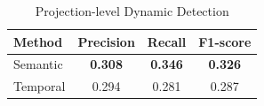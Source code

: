\begin{table}[t]
  \centering
  \caption{Projection-level Dynamic Detection}
  \label{tab:p4_projection_level}
  \begin{tabular}{lccc}
    \hline
    Method & Precision & Recall & F1-score \\
    \hline
    Semantic & \textbf{0.308} & \textbf{0.346} & \textbf{0.326} \\
    Temporal & 0.294 & 0.281 & 0.287 \\
    \hline
  \end{tabular}
\end{table}
